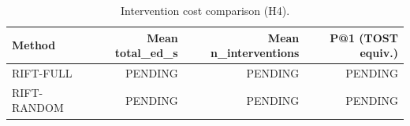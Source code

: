 \begin{table}[t]
  \centering
  \caption{Intervention cost comparison (H4).}
  \begin{tabular}{lrrr}
    \hline
    Method & Mean total\_ed\_s & Mean n\_interventions & P@1 (TOST equiv.) \\
    \hline
    RIFT-FULL & PENDING & PENDING & PENDING \\
    RIFT-RANDOM & PENDING & PENDING & PENDING \\
    \hline
  \end{tabular}
\end{table}
